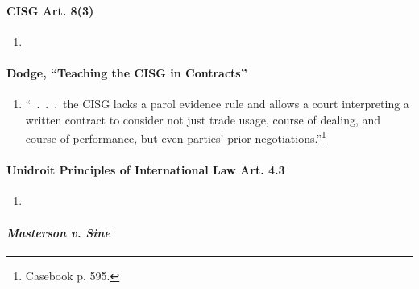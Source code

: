 \paragraph{CISG Art. 8(3)}

\begin{enumerate}
    \item %
\end{enumerate}

\paragraph{Dodge, ``Teaching the CISG in Contracts''}

\begin{enumerate}
    \item ``~.~.~.~the CISG lacks a parol evidence rule and allows a court 
    interpreting a written contract to consider not just trade usage, course 
    of dealing, and course of performance, but even parties' prior 
    negotiations.''\footnote{Casebook p. 595.}
\end{enumerate}

\paragraph{Unidroit Principles of International Law Art. 4.3}

\begin{enumerate}
    \item %
\end{enumerate}

\paragraph{\emph{Masterson v. Sine}}

